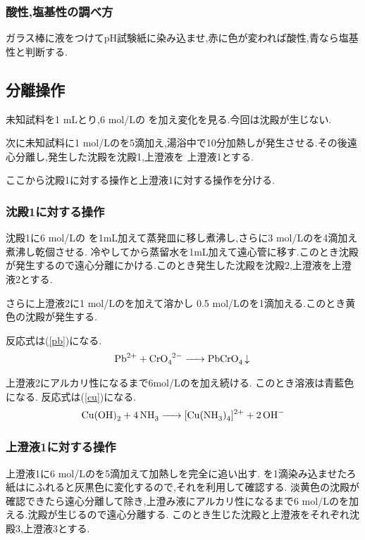 \documentclass[a4j,10pt]{jarticle}
\begin{document}
  \subsubsection{酸性,塩基性の調べ方}
  ガラス棒に液をつけてpH試験紙に染み込ませ,赤に色が変われば酸性,青なら塩基性と判断する.

  \subsection{分離操作}
  未知試料を1 mLとり,6 mol/Lの を加え変化を見る.今回は沈殿が生じない.
  
  次に未知試料に1 mol/Lのを5滴加え,湯浴中で10分加熱しが発生させる.その後遠心分離し,発生した沈殿を沈殿1,上澄液を
  上澄液1とする.
  
  ここから沈殿1に対する操作と上澄液1に対する操作を分ける.
  \subsubsection{沈殿1に対する操作}
  沈殿1に6 mol/Lの を1mL加えて蒸発皿に移し煮沸し,さらに3 mol/Lのを4滴加え煮沸し乾個させる.
  冷やしてから蒸留水を1mL加えて遠心管に移す.このとき沈殿が発生するので遠心分離にかける.このとき発生した沈殿を沈殿2,上澄液を上澄液2とする.
  
  さらに上澄液2に1 mol/Lのを加えて溶かし
  0.5 mol/Lのを1滴加える.このとき黄色の沈殿が発生する.
  
  反応式は(\ref{pb})になる.
  \begin{eqnarray}
    \label{pb}
    \ce{Pb^2+ + CrO4^2- -> PbCrO4 v}
  \end{eqnarray}
  
  上澄液2にアルカリ性になるまで6mol/Lのを加え続ける.
  このとき溶液は青藍色になる.
  反応式は(\ref{cu})になる.
  \begin{eqnarray}
    \label{cu}
    \ce{Cu(OH)2 + 4NH3 -> [Cu(NH3)4]^2+ + 2OH-}
  \end{eqnarray}
  \subsubsection{上澄液1に対する操作}
  上澄液1に6 mol/Lのを5滴加えて加熱しを完全に追い出す.
  を1滴染み込ませたろ紙はにふれると灰黒色に変化するので,それを利用して確認する.
  淡黄色の沈殿が確認できたら遠心分離して除き,上澄み液にアルカリ性になるまで6 mol/Lのを加える.沈殿が生じるので遠心分離する.
  このとき生じた沈殿と上澄液をそれぞれ沈殿3,上澄液3とする.
\end{document}

